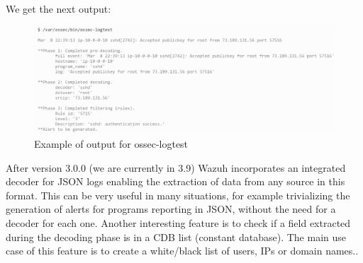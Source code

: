 \linej
We get the next output:
\begin{figure}[H]
  \centering
	\includegraphics[width=\textwidth]{figuras/ossec-logtest_output.png}
	\caption{Example of output for ossec-logtest}
\end{figure}
\linej
After version 3.0.0 (we are currently in 3.9) Wazuh incorporates an integrated decoder for JSON logs enabling the extraction of data from any source in this format. This can be very useful in many situations, for example trivializing the generation of alerts for programs reporting in JSON, without the need for a decoder for each one\cite{wazuh_json}.
\linej
\linej
Another interesting feature is to check if a field extracted during the decoding phase is in a CDB list (constant database). The main use case of this feature is to create a white/black list of users, IPs or domain names.\cite{wazuh_cdb}.
